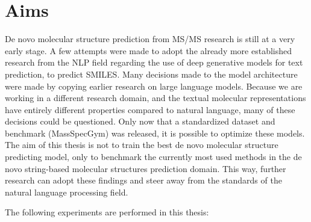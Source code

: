 \chapter{Aims}
\label{chap:aims}

De novo molecular structure prediction from \ac{MS/MS} research is still at a very early stage.
A few attempts were made to adopt the already more established research from the \ac{NLP} field regarding the use of deep generative models for text prediction, to predict SMILES.
Many decisions made to the model architecture were made by copying earlier research on large language models.
Because we are working in a different research domain, and the textual molecular representations have entirely different properties compared to natural language,
many of these decisions could be questioned.
Only now that a standardized dataset and benchmark (MassSpecGym) was released, it is possible to optimize these models.
The aim of this thesis is not to train the best de novo molecular structure predicting model,
only to benchmark the currently most used methods in the de novo string-based molecular structures prediction domain.
This way, further research can adopt these findings and steer away from the standards of the natural language processing field.

The following experiments are performed in this thesis:


